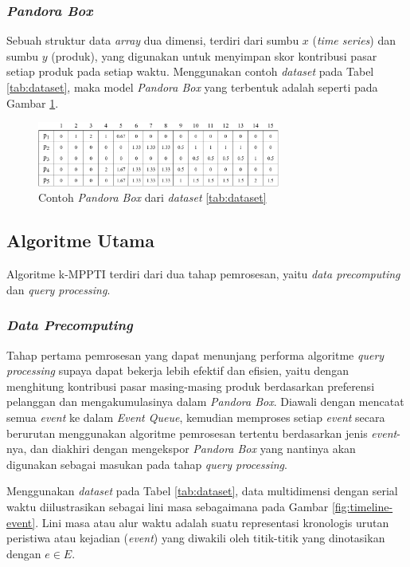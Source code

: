 \documentclass[conference]{IEEEtran}
\begin{document}
\subsubsection{\textbf{\textit{Pandora Box}}}
Sebuah struktur data \textit{array} dua dimensi, terdiri dari sumbu $x$ (\textit{time series}) dan sumbu $y$ (produk), yang digunakan untuk menyimpan skor kontribusi pasar setiap produk pada setiap waktu. Menggunakan contoh \textit{dataset} pada Tabel \ref{tab:dataset}, maka model \textit{Pandora Box} yang terbentuk adalah seperti pada Gambar \ref{fig:pbox}.  

\begin{figure}[htbp]
	\centering
	\includegraphics[width=8cm]{img/bab3/pbox.png}
	\caption{Contoh \textit{Pandora Box} dari \textit{dataset} \ref{tab:dataset}}
	\label{fig:pbox}
\end{figure}

\subsection{Algoritme Utama}
Algoritme k-MPPTI terdiri dari dua tahap pemrosesan, yaitu \textit{data precomputing} dan \textit{query processing}.

\subsubsection{\textbf{\textit{Data Precomputing}}}
Tahap pertama pemrosesan yang dapat menunjang performa algoritme \textit{query processing} supaya dapat bekerja lebih efektif dan efisien, yaitu dengan menghitung kontribusi pasar masing-masing produk berdasarkan preferensi pelanggan dan mengakumulasinya dalam \textit{Pandora Box}. Diawali dengan mencatat semua \textit{event} ke dalam \textit{Event Queue}, kemudian memproses setiap \textit{event} secara berurutan menggunakan algoritme pemrosesan tertentu berdasarkan jenis \textit{event}-nya, dan diakhiri dengan mengekspor \textit{Pandora Box} yang nantinya akan digunakan sebagai masukan pada tahap \textit{query processing}.

Menggunakan \textit{dataset} pada Tabel \ref{tab:dataset}, data multidimensi dengan serial waktu diilustrasikan sebagai lini masa sebagaimana pada Gambar \ref{fig:timeline-event}. Lini masa atau alur waktu adalah suatu representasi kronologis urutan peristiwa atau kejadian (\textit{event}) yang diwakili oleh titik-titik yang dinotasikan dengan $e \in E$. 
\end{document}
